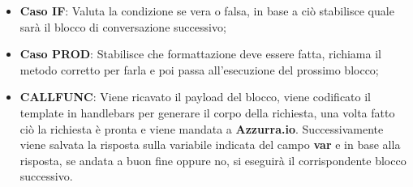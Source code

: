 \begin{enumerate}
\begin{itemize}
		\item \textbf{Caso IF}: Valuta la condizione se vera o falsa, in base a ciò stabilisce quale sarà il blocco di conversazione successivo;
		\item \textbf{Caso PROD}: Stabilisce che formattazione deve essere fatta, richiama il metodo corretto per farla e poi passa all'esecuzione del prossimo blocco;
		\item \textbf{CALLFUNC}: Viene ricavato il payload del blocco, viene codificato il template in handlebars per generare il corpo della richiesta, una volta fatto ciò la richiesta è pronta e viene mandata a \textbf{Azzurra.io}. Successivamente viene salvata la risposta sulla variabile indicata del campo \textbf{var} e in base alla risposta, se andata a buon fine oppure no, si eseguirà il corrispondente blocco successivo.
	\end{itemize}
\end{enumerate}
 
  




